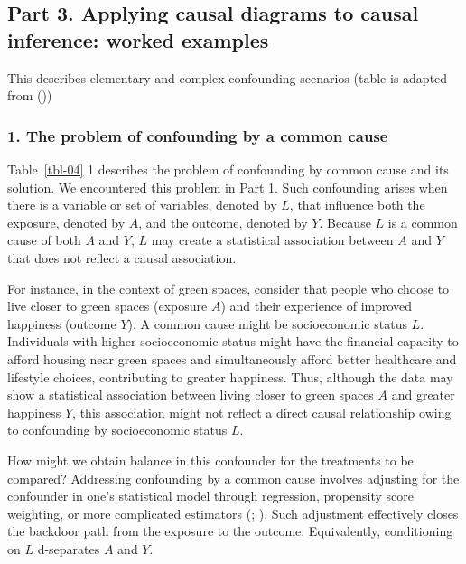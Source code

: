 \documentclass[
  singlecolumn]{article}
\begin{document}
\subsection{Part 3. Applying causal diagrams to causal inference: worked
examples}\label{part-3.-applying-causal-diagrams-to-causal-inference-worked-examples}

\begin{table}

\caption{\label{tbl-04}This describes elementary and complex confounding
scenarios (table is adapted from ())}

\centering{

\terminologyelconfoundersLONG

}

\end{table}%

\subsubsection{1. The problem of confounding by a common
cause}\label{the-problem-of-confounding-by-a-common-cause}

Table~\ref{tbl-04} 1 describes the problem of confounding by common
cause and its solution. We encountered this problem in Part 1. Such
confounding arises when there is a variable or set of variables, denoted
by \(L\), that influence both the exposure, denoted by \(A\), and the
outcome, denoted by \(Y.\) Because \(L\) is a common cause of both \(A\)
and \(Y\), \(L\) may create a statistical association between \(A\) and
\(Y\) that does not reflect a causal association.

For instance, in the context of green spaces, consider that people who
choose to live closer to green spaces (exposure \(A\)) and their
experience of improved happiness (outcome \(Y\)). A common cause might
be socioeconomic status \(L\). Individuals with higher socioeconomic
status might have the financial capacity to afford housing near green
spaces and simultaneously afford better healthcare and lifestyle
choices, contributing to greater happiness. Thus, although the data may
show a statistical association between living closer to green spaces
\(A\) and greater happiness \(Y\), this association might not reflect a
direct causal relationship owing to confounding by socioeconomic status
\(L\).

How might we obtain balance in this confounder for the treatments to be
compared? Addressing confounding by a common cause involves adjusting
for the confounder in one's statistical model through regression,
propensity score weighting, or more complicated estimators
(;
). Such adjustment
effectively closes the backdoor path from the exposure to the outcome.
Equivalently, conditioning on \(L\) d-separates \(A\) and \(Y\).
\end{document}
